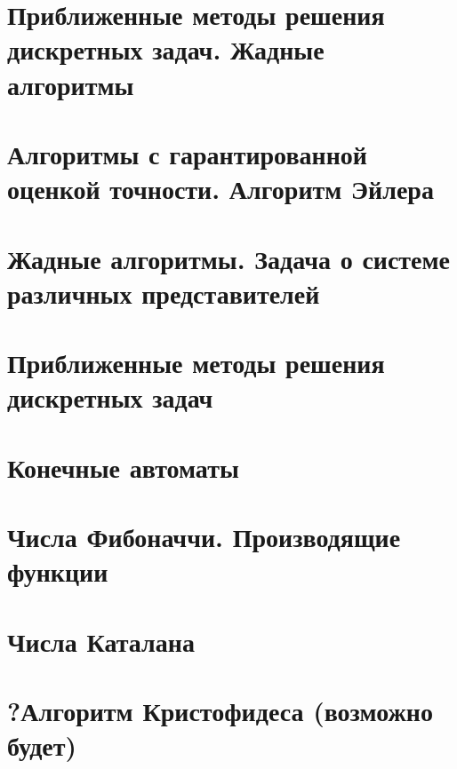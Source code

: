 \documentclass[12pt, fleqn]{article}
\begin{document}
\section{Приближенные методы решения дискретных задач. Жадные алгоритмы}


\section{Алгоритмы с гарантированной оценкой точности. Алгоритм Эйлера}


\section{Жадные алгоритмы. Задача о системе различных представителей}


\section{Приближенные методы решения дискретных задач}


\section{Конечные автоматы}


\section{Числа Фибоначчи. Производящие функции}


\section{Числа Каталана}


\section{?Алгоритм Кристофидеса (возможно будет)}
\end{document}
